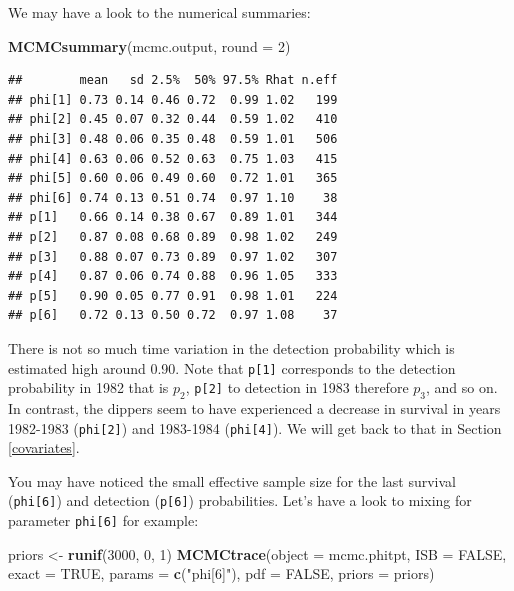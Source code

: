 \documentclass[
  12pt,
]{krantz}
\newenvironment{Shaded}{\begin{snugshade}}{\end{snugshade}}
\newcommand{\AttributeTok}[1]{\textcolor[rgb]{0.13,0.29,0.53}{#1}}
\newcommand{\ConstantTok}[1]{\textcolor[rgb]{0.56,0.35,0.01}{#1}}
\newcommand{\DecValTok}[1]{\textcolor[rgb]{0.00,0.00,0.81}{#1}}
\newcommand{\FunctionTok}[1]{\textcolor[rgb]{0.13,0.29,0.53}{\textbf{#1}}}
\newcommand{\NormalTok}[1]{#1}
\newcommand{\OtherTok}[1]{\textcolor[rgb]{0.56,0.35,0.01}{#1}}
\newcommand{\StringTok}[1]{\textcolor[rgb]{0.31,0.60,0.02}{#1}}
\begin{document}
We may have a look to the numerical summaries:

\begin{Shaded}
\begin{Highlighting}[]
\FunctionTok{MCMCsummary}\NormalTok{(mcmc.output, }\AttributeTok{round =} \DecValTok{2}\NormalTok{)}
\end{Highlighting}
\end{Shaded}

\begin{verbatim}
##        mean   sd 2.5%  50% 97.5% Rhat n.eff
## phi[1] 0.73 0.14 0.46 0.72  0.99 1.02   199
## phi[2] 0.45 0.07 0.32 0.44  0.59 1.02   410
## phi[3] 0.48 0.06 0.35 0.48  0.59 1.01   506
## phi[4] 0.63 0.06 0.52 0.63  0.75 1.03   415
## phi[5] 0.60 0.06 0.49 0.60  0.72 1.01   365
## phi[6] 0.74 0.13 0.51 0.74  0.97 1.10    38
## p[1]   0.66 0.14 0.38 0.67  0.89 1.01   344
## p[2]   0.87 0.08 0.68 0.89  0.98 1.02   249
## p[3]   0.88 0.07 0.73 0.89  0.97 1.02   307
## p[4]   0.87 0.06 0.74 0.88  0.96 1.05   333
## p[5]   0.90 0.05 0.77 0.91  0.98 1.01   224
## p[6]   0.72 0.13 0.50 0.72  0.97 1.08    37
\end{verbatim}

There is not so much time variation in the detection probability which is estimated high around 0.90. Note that \texttt{p{[}1{]}} corresponds to the detection probability in 1982 that is \(p_2\), \texttt{p{[}2{]}} to detection in 1983 therefore \(p_3\), and so on. In contrast, the dippers seem to have experienced a decrease in survival in years 1982-1983 (\texttt{phi{[}2{]}}) and 1983-1984 (\texttt{phi{[}4{]}}). We will get back to that in Section \ref{covariates}.

You may have noticed the small effective sample size for the last survival (\texttt{phi{[}6{]}}) and detection (\texttt{p{[}6{]}}) probabilities. Let's have a look to mixing for parameter \texttt{phi{[}6{]}} for example:

\begin{Shaded}
\begin{Highlighting}[]
\NormalTok{priors }\OtherTok{\textless{}{-}} \FunctionTok{runif}\NormalTok{(}\DecValTok{3000}\NormalTok{, }\DecValTok{0}\NormalTok{, }\DecValTok{1}\NormalTok{)}
\FunctionTok{MCMCtrace}\NormalTok{(}\AttributeTok{object =}\NormalTok{ mcmc.phitpt,}
          \AttributeTok{ISB =} \ConstantTok{FALSE}\NormalTok{,}
          \AttributeTok{exact =} \ConstantTok{TRUE}\NormalTok{, }
          \AttributeTok{params =} \FunctionTok{c}\NormalTok{(}\StringTok{"phi[6]"}\NormalTok{),}
          \AttributeTok{pdf =} \ConstantTok{FALSE}\NormalTok{, }
          \AttributeTok{priors =}\NormalTok{ priors)}
\end{Highlighting}
\end{Shaded}
\end{document}
